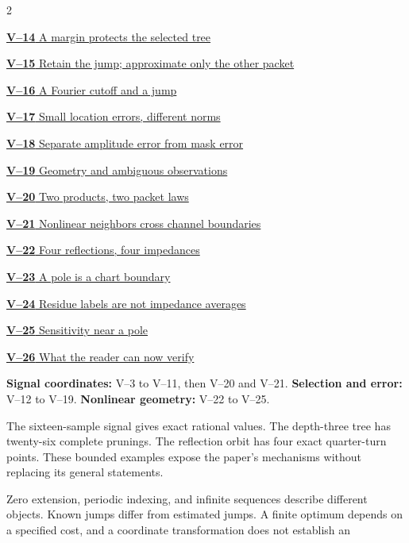 \documentclass[11pt,a4paper]{article}
\newcommand{\head}[1]{\par\vspace{2pt}{\sffamily\bfseries\normalsize #1}\par\vspace{1pt}}
\begin{document}
\begin{multicols}{2}
{\small\noindent\hyperlink{vpage14}{\textbf{V--14} A margin protects the selected tree}\par\smallskip}
{\small\noindent\hyperlink{vpage15}{\textbf{V--15} Retain the jump; approximate only the other packet}\par\smallskip}
{\small\noindent\hyperlink{vpage16}{\textbf{V--16} A Fourier cutoff and a jump}\par\smallskip}
{\small\noindent\hyperlink{vpage17}{\textbf{V--17} Small location errors, different norms}\par\smallskip}
{\small\noindent\hyperlink{vpage18}{\textbf{V--18} Separate amplitude error from mask error}\par\smallskip}
{\small\noindent\hyperlink{vpage19}{\textbf{V--19} Geometry and ambiguous observations}\par\smallskip}
{\small\noindent\hyperlink{vpage20}{\textbf{V--20} Two products, two packet laws}\par\smallskip}
{\small\noindent\hyperlink{vpage21}{\textbf{V--21} Nonlinear neighbors cross channel boundaries}\par\smallskip}
{\small\noindent\hyperlink{vpage22}{\textbf{V--22} Four reflections, four impedances}\par\smallskip}
{\small\noindent\hyperlink{vpage23}{\textbf{V--23} A pole is a chart boundary}\par\smallskip}
{\small\noindent\hyperlink{vpage24}{\textbf{V--24} Residue labels are not impedance averages}\par\smallskip}
{\small\noindent\hyperlink{vpage25}{\textbf{V--25} Sensitivity near a pole}\par\smallskip}
{\small\noindent\hyperlink{vpage26}{\textbf{V--26} What the reader can now verify}\par\smallskip}
\end{multicols}
\medskip
\head{Three reading routes}
\textbf{Signal coordinates:} V--3 to V--11, then V--20 and V--21.
\textbf{Selection and error:} V--12 to V--19.
\textbf{Nonlinear geometry:} V--22 to V--25.
\head{One model per question}
The sixteen-sample signal gives exact rational values. The depth-three tree
has twenty-six complete prunings. The reflection orbit has four exact
quarter-turn points. These bounded examples expose the paper's mechanisms
without replacing its general statements.
\head{Read the hypotheses with the picture}
Zero extension, periodic indexing, and infinite sequences describe different
objects. Known jumps differ from estimated jumps. A finite optimum depends
on a specified cost, and a coordinate transformation does not establish an
\end{document}
